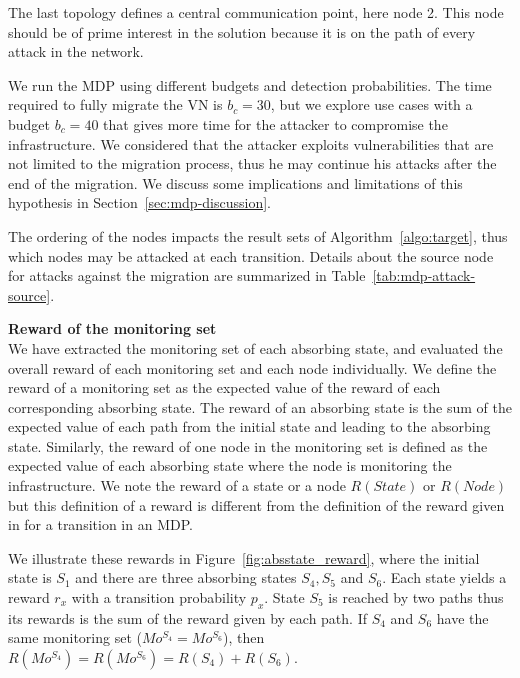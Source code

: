  The last topology defines a central communication point, here node 2. This node should be of prime interest in the solution because it is on the path of every attack in the network.



We run the MDP using different budgets and detection probabilities.
The time required to fully migrate the VN is $b_c=30$, but we explore use cases with a budget $b_c=40$ that gives more time for the attacker to compromise the infrastructure. We considered that the attacker exploits vulnerabilities that are not limited to the migration process, thus he may continue his attacks after the end of the migration. We discuss some implications and limitations of this hypothesis in Section~\ref{sec:mdp-discussion}.

The ordering of the nodes impacts the result sets of Algorithm~\ref{algo:target}, thus which nodes may be attacked at each transition.
Details about the source node for attacks against the migration are summarized in Table~\ref{tab:mdp-attack-source}.



\textbf{Reward of the monitoring set\\}
We have extracted the monitoring set of each absorbing state, and evaluated the overall reward of each monitoring set and each node individually.
We define the reward of a monitoring set as the expected value of the reward of each corresponding absorbing state.
The reward of an absorbing state is the sum of the expected value of each path from the initial state and leading to the absorbing state. Similarly, the reward of one node in the monitoring set is defined as the expected value of each absorbing state where the node is monitoring the infrastructure.
We note the reward of a state or a node $R(State)$ or $R(Node)$ but this definition of a reward is different from the definition of the reward given in for a transition in an MDP.

We illustrate these rewards in Figure~\ref{fig:absstate_reward}, where the initial state is $S_1$ and there are three absorbing states $S_4,S_5$ and $S_6$. Each state yields a reward $r_x$ with a transition probability $p_x$.
State $S_5$ is reached by two paths thus its rewards is the sum of the reward given by each path.
If $S_4$ and $S_6$ have the same monitoring set (\ie $Mo^{S_4} = Mo^{S_6}$), then $R(Mo^{S_4}) = R(Mo^{S_6}) = R(S_4) + R(S_6)$.


